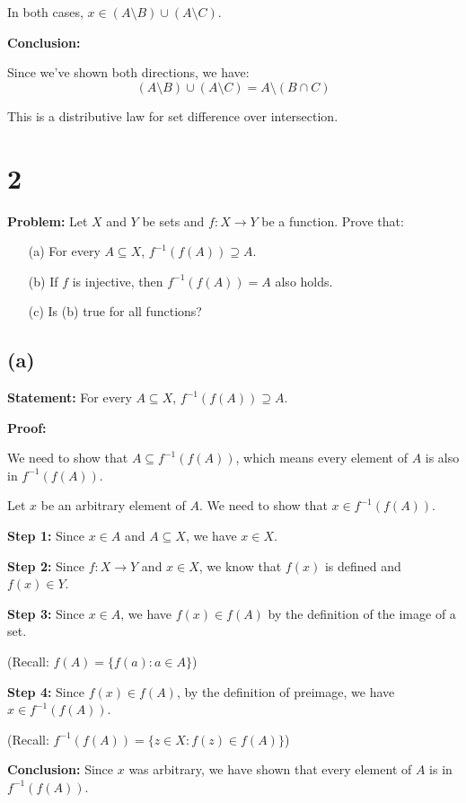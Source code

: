 \documentclass[12pt,a4paper]{article}
\theoremstyle{definition}
\theoremstyle{remark}
\begin{document}
In both cases, $x \in (A \setminus B) \cup (A \setminus C)$.

\textbf{Conclusion:}

Since we've shown both directions, we have:
$$(A \setminus B) \cup (A \setminus C) = A \setminus (B \cap C)$$

This is a distributive law for set difference over intersection.

\section*{2}


\textbf{Problem:} Let $X$ and $Y$ be sets and $f : X \to Y$ be a function. Prove that:

\begin{enumerate}
\item[(a)] For every $A \subseteq X$, $f^{-1}(f(A)) \supseteq A$.
\item[(b)] If $f$ is injective, then $f^{-1}(f(A)) = A$ also holds.
\item[(c)] Is (b) true for all functions?
\end{enumerate}

\subsection*{(a)}

\textbf{Statement:} For every $A \subseteq X$, $f^{-1}(f(A)) \supseteq A$.

\textbf{Proof:}

We need to show that $A \subseteq f^{-1}(f(A))$, which means every element of $A$ is also in $f^{-1}(f(A))$.

Let $x$ be an arbitrary element of $A$. We need to show that $x \in f^{-1}(f(A))$.

\textbf{Step 1:} Since $x \in A$ and $A \subseteq X$, we have $x \in X$.

\textbf{Step 2:} Since $f : X \to Y$ and $x \in X$, we know that $f(x)$ is defined and $f(x) \in Y$.

\textbf{Step 3:} Since $x \in A$, we have $f(x) \in f(A)$ by the definition of the image of a set.

(Recall: $f(A) = \{f(a) : a \in A\}$)

\textbf{Step 4:} Since $f(x) \in f(A)$, by the definition of preimage, we have $x \in f^{-1}(f(A))$.

(Recall: $f^{-1}(f(A)) = \{z \in X : f(z) \in f(A)\}$)

\textbf{Conclusion:} Since $x$ was arbitrary, we have shown that every element of $A$ is in $f^{-1}(f(A))$.
\end{document}
